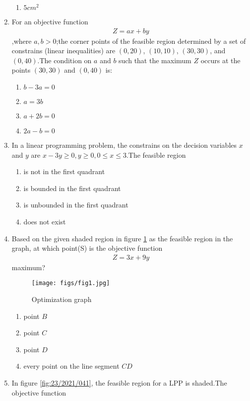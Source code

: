 \documentclass{article}
\begin{document}
\begin{enumerate}
\begin{enumerate}
    \item $5cm^2$
\end{enumerate}
\item For an objective function 
\begin{align}
	Z=ax+by
\end{align}		
		,where $a,b>0$;the corner points of the feasible region determined by a set of constrains (linear inequalities) are $(0,20)$, $(10,10)$, $(30,30)$, and $(0,40)$.The condition on $a$ and $b$ such that the maximum $Z$ occurs at the points $(30,30)$ and $(0,40)$ is: 
\begin{enumerate}
    \item $b-3a=0$
    \item $a=3b$
    \item $a+2b=0$
    \item $2a-b=0$
\end{enumerate}
\item In a linear programming problem, the constrains on the decision variables $x$ and $y$ are $x-3y \geq 0, y \geq 0, 0\leq x \leq 3$.The feasible region 
\begin{enumerate}
    \item is not in the first quadrant
    \item is bounded in the first quadrant 
    \item is unbounded in the first quadrant 
    \item does not exist  
\end{enumerate}
\item Based on the given shaded region in figure \ref{fig:19/2021/041} as the feasible region in the graph, at which point(S) is the objective function 
\begin{align}
	Z=3x+9y 
\end{align}
		maximum?
\begin{figure}[h]
    \centering{}
    \texttt{[image: figs/fig1.jpg]}
	\caption{Optimization graph}
    \label{fig:19/2021/041}
\end{figure}
\begin{enumerate}
    \item point $B$
    \item point $C$
    \item point $D$
    \item every point on the line segment $CD$   
\end{enumerate}
\item In figure \ref{fig:23/2021/041}, the feasible region for a LPP is shaded.The objective function 

\end{enumerate}
\end{document}
